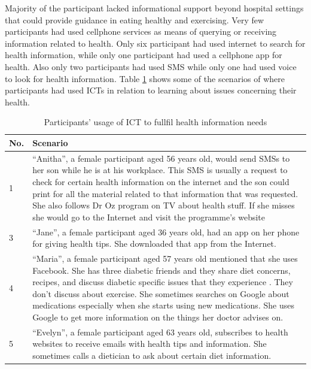 Majority of the participant lacked informational support beyond hospital settings that could provide guidance in eating healthy and exercising. Very few participants had used cellphone services as means of querying or receiving information related to health. Only six participant had used internet to search for health information, while only one participant had used a cellphone app for health. Also only two participants had used SMS while only one had used voice to look for health information. Table \ref{table:health_information} shows some of the scenarios of where participants had used ICTs in relation to learning about issues concerning their health.
\begin{table}[h!]
\begin{center}
    \caption{Participants’ usage of ICT to fullfil health information needs}
    \label{table:health_information}
	\begin{tabular}{|p{1cm}|p{12cm}|}
		\hline
		 \textbf{No.}&\textbf{Scenario}\\
		 \hline
		 1&``Anitha'', a female participant aged 56 years old, would send SMSs to her son while he is at his workplace. This SMS is usually a request to check for certain  health information on the internet and the son could print for all the material related to that information that was requested. She also follows Dr Oz program on TV about health stuff. If she misses she would go to the Internet and visit the programme's website\\
	  \hline
	  3& ``Jane'', a female participant aged 36 years old, had an app on her phone for giving health tips. She downloaded that app from the Internet.\\
	  \hline
	  4& ``Maria'', a female participant aged 57 years old mentioned that she uses Facebook. She has three diabetic friends and they share diet concerns, recipes, and discuss diabetic specific issues that they experience . They don't discuss about exercise. She sometimes searches on Google about medications especially when she starts using new medications. She uses Google to get more information on the things her doctor advises on.\\
	  \hline
	  5& ``Evelyn'', a female participant aged 63 years old, subscribes to health websites to receive emails with health tips and information. She sometimes calls a dietician to ask about certain diet information.\\
	  \hline
	\end{tabular}
  \end{center}
\end{table}

